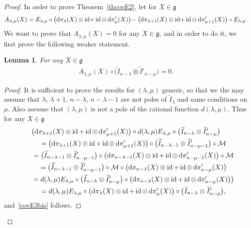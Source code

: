 \documentclass[10pt,a4paper]{amsart}
\DeclareMathOperator{\id}{id}
\numberwithin{equation}{section}
\newtheorem{lem}[theor]{Lemma}
\begin{document}
\begin{proof}
 In order to prove Theorem~\ref{thcovE2}, let for $X\in \mathfrak g$
 \begin{gather*}\label{covE3}
 A_{\lambda,\mu}(X) = E_{\lambda, \mu} \circ \big({{\rm d}}\pi_\lambda(X)\otimes \id\!+\id\otimes\, {{\rm d}}\pi'_\mu(X)\big)\!- \big({{\rm d}}\pi_{\lambda+1}(X)\otimes \id\!+\id\otimes\, {{\rm d}}\pi'_{\mu+1}(X)\big)\circ E_{\lambda, \mu}.
 \end{gather*}
 We want to prove that $A_{\lambda, \mu}(X)=0$ for any $X\in \mathfrak g$, and in order to do it, we first prove the following weaker statement.
 \begin{lem} For any $X\in \mathfrak g$
 \begin{gather}\label{covE3bis}
 A_{\lambda, \mu} (X)\circ \big(\widetilde I_{n-\lambda} \otimes \widetilde I'_{n-\mu}\big)=0.
 \end{gather}
 \end{lem}
\begin{proof}
It is sufficient to prove the results for $(\lambda, \mu)$ generic, so that we the may assume that $\lambda$, $\lambda+1$, $n-\lambda$, $n-\lambda-1$ are not poles of $\widetilde I_\lambda$ and same conditions on $\mu$. Also assume that $(\lambda, \mu)$ is not a pole of the rational function $d(\lambda, \mu)$. Thus for any $X\in \mathfrak g$
\begin{gather*}
\big({{\rm d}}\pi_{\lambda+1}(X)\otimes \id+\id\otimes\, {{\rm d}}\pi'_{\mu+1}(X)\big)\circ d(\lambda,\mu) E_{\lambda, \mu}\circ \big(\widetilde I_{n-\lambda}\otimes \widetilde I'_{n-\mu}\big)
\\ \qquad
{}= \big({{\rm d}}\pi_{\lambda+1}(X)\otimes \id+\id\otimes\, {{\rm d}}\pi'_{\mu+1}(X)\big)\circ \big(\widetilde I_{n-\lambda-1} \otimes \widetilde I'_{n-\mu-1} \big)\circ \mathcal{M}
\\ \qquad
{}= \big(\widetilde I_{n-\lambda-1} \otimes \widetilde I'_{n-\mu-1} \big)\circ \big({{\rm d}}\pi_{n-\lambda-1}(X)\otimes \id+\id\otimes\, {{\rm d}}\pi'_{n-\mu-1}(X)\big)\circ \mathcal{M}
\\ \qquad
{}=\big(\widetilde I_{n-\lambda-1} \otimes \widetilde I'_{n-\mu-1} \big)\circ \mathcal{M}\circ\big({{\rm d}}\pi_{n-\lambda}(X)\otimes \id+\id\otimes\,{{\rm d}}\pi'_{n-\mu}(X)\big)
\\ \qquad
{}= d(\lambda,\mu) E_{\lambda,\mu} \circ \big(\widetilde I_{n-\lambda} \otimes \widetilde I'_{n-\mu} \big)\circ \big({{\rm d}}\pi_{n-\lambda}(X)\otimes \id+\id\otimes\, {{\rm d}}\pi'_{n-\mu}(X)\big) \big)
\\ \qquad
{}= d(\lambda,\mu) E_{\lambda, \mu} \circ \big({{\rm d}}\pi_{\lambda}(X)\otimes \id+\id\otimes\, {{\rm d}}\pi'_{\mu}(X)\big)\circ \big(\widetilde I_{n-\lambda} \otimes \widetilde I'_{n-\mu} \big) ,
\end{gather*}
and~\eqref{covE3bis} follows.
\end{proof}


\end{proof}
\end{document}
